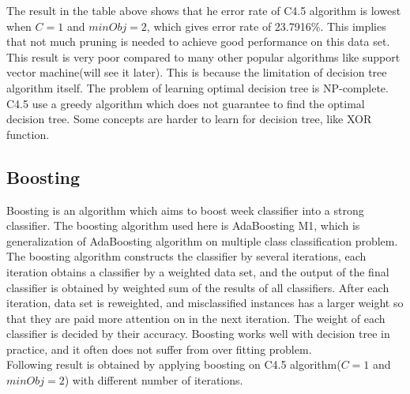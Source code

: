 \documentclass[a4paper,11pt]{article}
\begin{document}
The result in the table above shows that he error rate of C4.5 algorithm is lowest when $C=1$ and $minObj=2$, which gives error rate of 23.7916\%. This implies that not much pruning is needed to achieve good performance on this data set.\\
This result is very poor compared to many other popular algorithms like support vector machine(will see it later). This is because the limitation of decision tree algorithm itself. The problem of learning optimal decision tree is NP-complete\cite{DT_NPC}. C4.5 use a greedy algorithm which does not guarantee to find the optimal decision tree. Some concepts are harder to learn for decision tree, like XOR function.\\

\subsection{Boosting}
Boosting is an algorithm which aims to boost week classifier into a strong classifier. The boosting algorithm used here is AdaBoosting M1, which is
generalization of AdaBoosting algorithm on multiple class classification problem.\\
The boosting algorithm constructs the classifier by several iterations, each iteration obtains a classifier by a weighted data set, and the output of the final classifier is obtained by weighted sum of the results of all classifiers. After each iteration, data set is reweighted, and misclassified instances has a larger weight so that they are paid more attention on in the next iteration. The weight of each classifier is decided by their accuracy. Boosting works well with decision tree in practice, and it often does not suffer from over fitting problem.\\
Following result is obtained by applying boosting on C4.5 algorithm($C=1$ and $minObj=2$) with different number of iterations.
\end{document}

